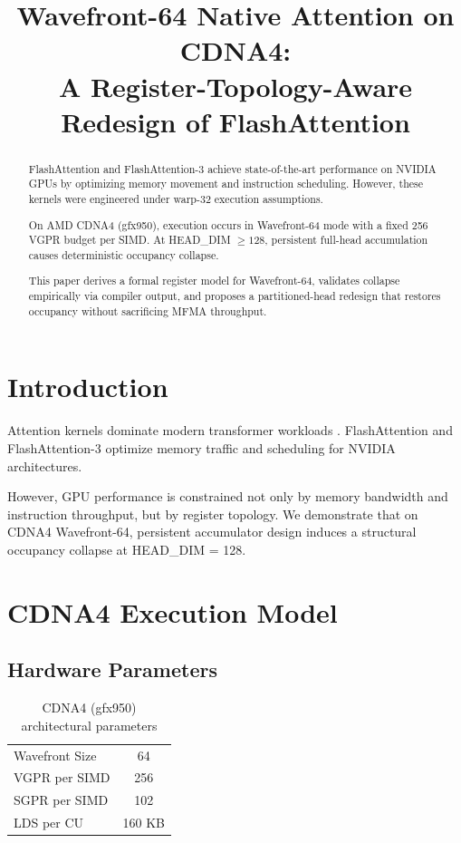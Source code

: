 \documentclass[conference]{IEEEtran}
\title{Wavefront-64 Native Attention on CDNA4:\\
A Register-Topology-Aware Redesign of FlashAttention}
\author{
\IEEEauthorblockN{Chandan Kumar}
\IEEEauthorblockA{
Independent Research\\
Email: cs84861@gmail.com
}
}
\begin{document}
\maketitle

\begin{abstract}
FlashAttention and FlashAttention-3 achieve state-of-the-art performance on NVIDIA GPUs by optimizing memory movement and instruction scheduling.
However, these kernels were engineered under warp-32 execution assumptions.

On AMD CDNA4 (gfx950), execution occurs in Wavefront-64 mode with a fixed 256 VGPR budget per SIMD.
At HEAD\_DIM $\ge 128$, persistent full-head accumulation causes deterministic occupancy collapse.

This paper derives a formal register model for Wavefront-64, validates collapse empirically via compiler output, and proposes a partitioned-head redesign that restores occupancy without sacrificing MFMA throughput.
\end{abstract}

\section{Introduction}

Attention kernels dominate modern transformer workloads \cite{vaswani2017attention}.
FlashAttention \cite{dao2022flashattention} and FlashAttention-3 \cite{dao2024flash3} optimize memory traffic and scheduling for NVIDIA architectures.

However, GPU performance is constrained not only by memory bandwidth and instruction throughput, but by register topology.
We demonstrate that on CDNA4 Wavefront-64, persistent accumulator design induces a structural occupancy collapse at HEAD\_DIM = 128.

\section{CDNA4 Execution Model}

\subsection{Hardware Parameters}

\begin{table}[h]
\centering
\begin{tabular}{lc}
\toprule
Wavefront Size & 64 \\
VGPR per SIMD & 256 \\
SGPR per SIMD & 102 \\
LDS per CU & 160 KB \\
\bottomrule
\end{tabular}
\caption{CDNA4 (gfx950) architectural parameters}
\end{table}
\end{document}
